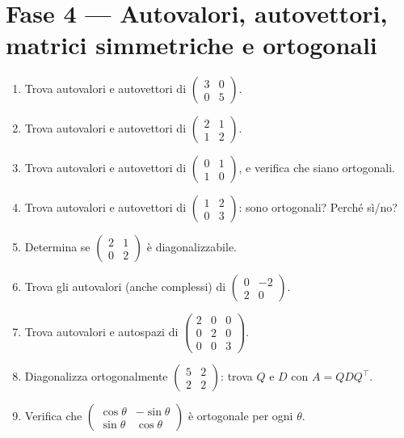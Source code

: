 \documentclass[a4paper,11pt]{article}
\begin{document}
\section{Fase 4 --- Autovalori, autovettori, matrici simmetriche e ortogonali}
\begin{enumerate}
  \item Trova autovalori e autovettori di $\begin{pmatrix}3&0\\0&5\end{pmatrix}$.
  \item Trova autovalori e autovettori di $\begin{pmatrix}2&1\\1&2\end{pmatrix}$.
  \item Trova autovalori e autovettori di $\begin{pmatrix}0&1\\1&0\end{pmatrix}$, e verifica che siano ortogonali.
  \item Trova autovalori e autovettori di $\begin{pmatrix}1&2\\0&3\end{pmatrix}$: sono ortogonali? Perché sì/no?
  \item Determina se $\begin{pmatrix}2&1\\0&2\end{pmatrix}$ è diagonalizzabile.
  \item Trova gli autovalori (anche complessi) di $\begin{pmatrix}0&-2\\2&0\end{pmatrix}$.
  \item Trova autovalori e autospazi di $\begin{pmatrix}2&0&0\\0&2&0\\0&0&3\end{pmatrix}$.
  \item Diagonalizza ortogonalmente $\begin{pmatrix}5&2\\2&2\end{pmatrix}$: trova $Q$ e $D$ con $A=QDQ^\top$.
  \item Verifica che $\begin{pmatrix}\cos\theta&-\sin\theta\\\sin\theta&\cos\theta\end{pmatrix}$ è ortogonale per ogni $\theta$.

\end{enumerate}
\end{document}
